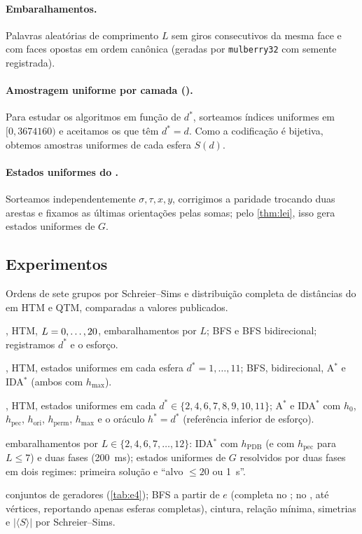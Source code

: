\paragraph{Embaralhamentos.} Palavras aleatórias de comprimento $L$ sem giros consecutivos da mesma face e com faces opostas em ordem canônica (geradas por \texttt{mulberry32} com semente registrada).

\paragraph{Amostragem uniforme por camada ().} Para estudar os algoritmos em função de $d^*$, sorteamos índices uniformes em $[0,\num{3674160})$ e aceitamos os que têm $d^*=d$. Como a codificação é bijetiva, obtemos amostras uniformes de cada esfera $S(d)$.

\paragraph{Estados uniformes do .} Sorteamos independentemente $\sigma,\tau,x,y$, corrigimos a paridade trocando duas arestas e fixamos as últimas orientações pelas somas; pelo \cref{thm:lei}, isso gera estados uniformes de $G$.

\subsection{Experimentos}
\begin{description}[nosep,leftmargin=1.2em]
\item[E0 --- validação.] Ordens de sete grupos por Schreier--Sims e distribuição completa de distâncias do  em HTM e QTM, comparadas a valores publicados.
\item[E1 --- crescimento (Q1).] , HTM, $L=0,\dots,\num{20}$, \gclEoneSamples{} embaralhamentos por $L$; BFS e BFS bidirecional; registramos $d^*$ e o esforço.
\item[E2 --- algoritmos (Q2).] , HTM, \gclEtwoSamples{} estados uniformes em cada esfera $d^*=1,\dots,11$; BFS, bidirecional, A$^*$ e IDA$^*$ (ambos com $h_{\max}$).
\item[E3 --- heurísticas (Q3).] , HTM, \gclEthreeSamples{} estados uniformes em cada $d^*\in\{2,4,6,7,\allowbreak 8,9,10,11\}$; A$^*$ e IDA$^*$ com $h_0$, $h_{\mathrm{pec}}$, $h_{\mathrm{ori}}$, $h_{\mathrm{perm}}$, $h_{\max}$ e o oráculo $h^*=d^*$ (referência inferior de esforço).
\item[E3b --- \cube{3}.] \gclEthreebSamples{} embaralhamentos por $L\in\{2,4,6,7,\dots,12\}$: IDA$^*$ com $h_{\mathrm{PDB}}$ (e com $h_{\mathrm{pec}}$ para $L\le7$) e duas fases (200~ms); \gclTPUniformN{} estados uniformes de $G$ resolvidos por duas fases em dois regimes: primeira solução e ``alvo $\le20$ ou 1~s''.
\item[E4 --- estrutura (Q4).] \gclEfourSets{} conjuntos de geradores (\cref{tab:e4}); BFS a partir de $e$ (completa no ; no , até \gclEfourMaxNodes{} vértices, reportando apenas esferas completas), cintura, relação mínima, simetrias e $|\langle S\rangle|$ por Schreier--Sims.
\end{description}

